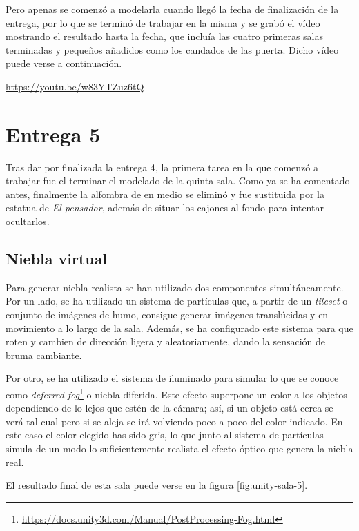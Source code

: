 Pero apenas se comenzó a modelarla cuando llegó la fecha de finalización de la entrega, por lo que se terminó de trabajar en la misma y se grabó el vídeo mostrando el resultado hasta la fecha, que incluía las cuatro primeras salas terminadas y pequeños añadidos como los candados de las puerta. Dicho vídeo puede verse a continuación.

\begin{center}
    \url{https://youtu.be/w83YTZuz6tQ}
\end{center}



\section{Entrega 5}

Tras dar por finalizada la entrega 4, la primera tarea en la que comenzó a trabajar fue el terminar el modelado de la quinta sala. Como ya se ha comentado antes, finalmente la alfombra de en medio se eliminó y fue sustituida por la estatua de \textit{El pensador}, además de situar los cajones al fondo para intentar ocultarlos. 

\subsection{Niebla virtual}

Para generar niebla realista se han utilizado dos componentes simultáneamente. Por un lado, se ha utilizado un sistema de partículas  que, a partir de un \textit{tileset} o conjunto de imágenes de humo, consigue generar imágenes translúcidas y en movimiento a lo largo de la sala. Además, se ha configurado este sistema para que roten y cambien de dirección ligera y aleatoriamente, dando la sensación de bruma cambiante. 

Por otro, se ha utilizado el sistema de iluminado para simular lo que se conoce como \textit{deferred fog}\footnote{\url{https://docs.unity3d.com/Manual/PostProcessing-Fog.html}} o niebla diferida. Este efecto superpone un color a los objetos dependiendo de lo lejos que estén de la cámara; así, si un objeto está cerca se verá tal cual pero si se aleja se irá volviendo poco a poco del color indicado. En este caso el color elegido has sido gris, lo que junto al sistema de partículas simula de un modo lo suficientemente realista el efecto óptico que genera la niebla real.

El resultado final de esta sala puede verse en la figura \ref{fig:unity-sala-5}.

